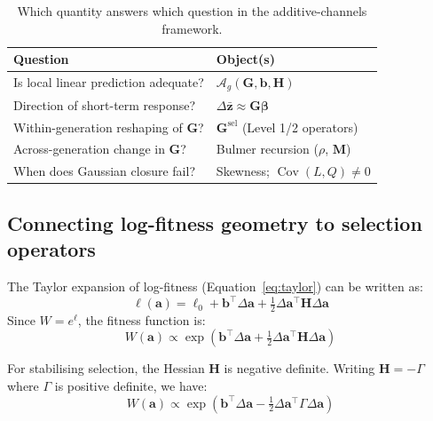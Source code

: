 \documentclass[9pt,twocolumn,twoside,lineno]{gsajnl}
\newcommand{\vect}[1]{\boldsymbol{#1}}
\newcommand{\mat}[1]{\mathbf{#1}}
\newcommand{\Ag}{\ensuremath{\mathcal{A}_{g}}\xspace}
\newcommand{\Gsel}{\ensuremath{\mat{G}^{\text{sel}}}\xspace}
\newcommand{\Cov}{\ensuremath{\operatorname{Cov}}\xspace}
\begin{document}
\begin{table}[H]
\centering
\caption{Which quantity answers which question in the additive-channels framework.}
\label{tab:questions}
\begin{tabular}{@{}p{4.5cm}p{3.8cm}@{}}
\toprule
Question & Object(s) \\
\midrule
Is local linear prediction adequate? & $\Ag(\mat{G}, \vect{b}, \mat{H})$ \\[2pt]
Direction of short-term response? & $\Delta\bar{\vect{z}} \approx \mat{G}\vect{\beta}$ \\[2pt]
Within-generation reshaping of $\mat{G}$? & $\Gsel$ (Level 1/2 operators) \\[2pt]
Across-generation change in $\mat{G}$? & Bulmer recursion ($\rho$, $\mat{M}$) \\[2pt]
When does Gaussian closure fail? & Skewness; $\Cov(L,Q) \neq 0$ \\
\bottomrule
\end{tabular}
\end{table}


\subsection{Connecting log-fitness geometry to selection operators}

The Taylor expansion of log-fitness (Equation~\ref{eq:taylor}) can be written as:
\begin{equation}
\ell(\vect{a}) = \ell_0 + \vect{b}^\top \Delta\vect{a} + \tfrac{1}{2}\Delta\vect{a}^\top \mat{H} \Delta\vect{a}
\end{equation}
Since $W = e^\ell$, the fitness function is:
\begin{equation}
W(\vect{a}) \propto \exp\left(\vect{b}^\top \Delta\vect{a} + \tfrac{1}{2}\Delta\vect{a}^\top \mat{H} \Delta\vect{a}\right)
\label{eq:W-from-ell}
\end{equation}

For stabilising selection, the Hessian $\mat{H}$ is negative definite. Writing $\mat{H} = -\Gamma$ where $\Gamma$ is positive definite, we have:
\begin{equation}
W(\vect{a}) \propto \exp\left(\vect{b}^\top \Delta\vect{a} - \tfrac{1}{2}\Delta\vect{a}^\top \Gamma \Delta\vect{a}\right)
\label{eq:W-Gaussian}
\end{equation}
\end{document}
